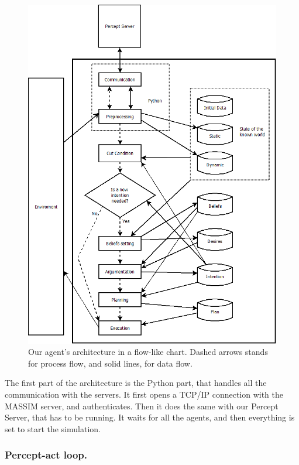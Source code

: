 \documentclass{llncs2e/llncs}
\begin{document}
\begin{figure}
 \centering
   \includegraphics[width=\textwidth]{agent_architecture2.png}
     \caption{Our agent's architecture in a flow-like chart. Dashed arrows stands for 
     process flow, and solid lines, for data flow.}
 \label{fig:architecture}
\end{figure}


    The first part of the architecture is the Python part, that handles all the 
    communication with the servers. It first opens a TCP/IP connection with the 
    MASSIM server, and authenticates. Then it does the same with our Percept 
    Server, that has to be running. It waits for all the agents, and then 
    everything is set to start the simulation.

\subsubsection{Percept-act loop.}
\end{document}
